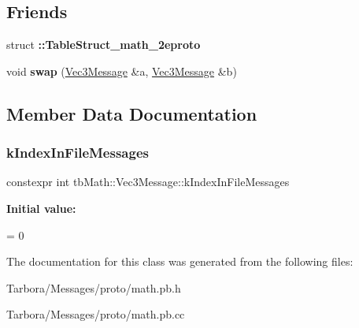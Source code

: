 \subsection*{Friends}
\begin{DoxyCompactItemize}
\item 
\mbox{\label{classtbMath_1_1Vec3Message_a016291c3138deb3d18455a730e2da9b1}} 
struct {\bfseries \+::\+Table\+Struct\+\_\+math\+\_\+2eproto}
\item 
\mbox{\label{classtbMath_1_1Vec3Message_aee3befc7dad9861a1296b0519be0c971}} 
void {\bfseries swap} (\hyperlink{classtbMath_1_1Vec3Message}{Vec3\+Message} \&a, \hyperlink{classtbMath_1_1Vec3Message}{Vec3\+Message} \&b)
\end{DoxyCompactItemize}


\subsection{Member Data Documentation}
\mbox{\label{classtbMath_1_1Vec3Message_a59c4a9b1d1c7b824a97c931969660854}} 
\subsubsection{\texorpdfstring{k\+Index\+In\+File\+Messages}{kIndexInFileMessages}}
{\footnotesize\ttfamily constexpr int tb\+Math\+::\+Vec3\+Message\+::k\+Index\+In\+File\+Messages\hspace{0.3cm}{\ttfamily [static]}}

{\bfseries Initial value\+:}
\begin{DoxyCode}
=
    0
\end{DoxyCode}


The documentation for this class was generated from the following files\+:\begin{DoxyCompactItemize}
\item 
Tarbora/\+Messages/proto/math.\+pb.\+h\item 
Tarbora/\+Messages/proto/math.\+pb.\+cc\end{DoxyCompactItemize}
